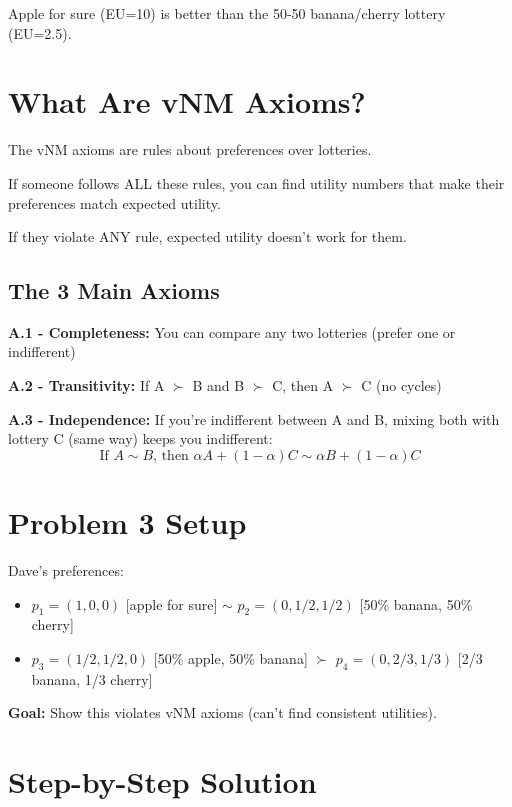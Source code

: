 \documentclass[11pt]{article}
\begin{document}
Apple for sure (EU=10) is better than the 50-50 banana/cherry lottery (EU=2.5).

\section{What Are vNM Axioms?}

\begin{tcolorbox}[colback=yellow!10!white,colframe=orange!75!black,title=Simple Version]
The vNM axioms are rules about preferences over lotteries.

If someone follows ALL these rules, you can find utility numbers that make their preferences match expected utility.

If they violate ANY rule, expected utility doesn't work for them.
\end{tcolorbox}

\subsection{The 3 Main Axioms}

\textbf{A.1 - Completeness:} You can compare any two lotteries (prefer one or indifferent)

\textbf{A.2 - Transitivity:} If A $\succ$ B and B $\succ$ C, then A $\succ$ C (no cycles)

\textbf{A.3 - Independence:} If you're indifferent between A and B, mixing both with lottery C (same way) keeps you indifferent:
$$\text{If } A \sim B \text{, then } \alpha A + (1-\alpha) C \sim \alpha B + (1-\alpha) C$$

\section{Problem 3 Setup}

Dave's preferences:
\begin{itemize}
\item $p_1 = (1, 0, 0)$ [apple for sure] $\sim$ $p_2 = (0, 1/2, 1/2)$ [50\% banana, 50\% cherry]
\item $p_3 = (1/2, 1/2, 0)$ [50\% apple, 50\% banana] $\succ$ $p_4 = (0, 2/3, 1/3)$ [2/3 banana, 1/3 cherry]
\end{itemize}

\textbf{Goal:} Show this violates vNM axioms (can't find consistent utilities).

\section{Step-by-Step Solution}
\end{document}
